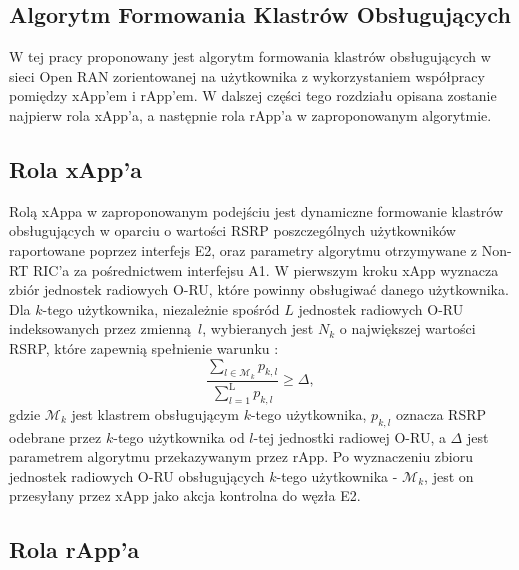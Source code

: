 \documentclass[a4paper]{article}
\begin{document}
\begin{multicols}{2}
\section{Algorytm Formowania Klastrów Obsługujących} \label{sec:xapprapp}

W tej pracy proponowany jest algorytm formowania klastrów obsługujących w sieci Open RAN zorientowanej na użytkownika z wykorzystaniem współpracy pomiędzy xApp'em i rApp'em. W dalszej części tego rozdziału opisana zostanie najpierw rola xApp'a, a następnie rola rApp'a w zaproponowanym algorytmie.

\subsection{Rola xApp'a}

Rolą xAppa w zaproponowanym podejściu jest dynamiczne formowanie klastrów obsługujących w oparciu o wartości RSRP poszczególnych użytkowników raportowane poprzez interfejs E2, oraz parametry algorytmu otrzymywane z Non-RT RIC'a za pośrednictwem interfejsu A1. W pierwszym kroku xApp wyznacza zbiór jednostek radiowych O-RU, które powinny obsługiwać danego użytkownika. Dla $k$-tego użytkownika, niezależnie spośród $L$ jednostek radiowych O-RU indeksowanych przez zmienną~$l$, wybieranych jest $N_k$ o największej wartości RSRP, które zapewnią spełnienie warunku \cite{tugfe2021cellfree}:
\begin{equation}\label{eq:serving_cluster_formulation}
\frac{\sum_{l \in \mathcal{M}_k}p_{k,l}}{\sum_{l=1}^{\mathrm{L}}p_{k,l}} \geq \Delta,
\end{equation}
gdzie $\mathcal{M}_k$ jest klastrem obsługującym $k$-tego użytkownika, $p_{k,l}$ oznacza RSRP odebrane przez $k$-tego użytkownika od $l$-tej jednostki radiowej O-RU, a $\Delta$ jest parametrem algorytmu przekazywanym przez rApp. Po wyznaczeniu zbioru jednostek radiowych O-RU obsługujących $k$-tego użytkownika - $\mathcal{M}_k$, jest on przesyłany przez xApp jako akcja kontrolna do węzła E2. 

\subsection{Rola rApp'a}


\end{multicols}
\end{document}
